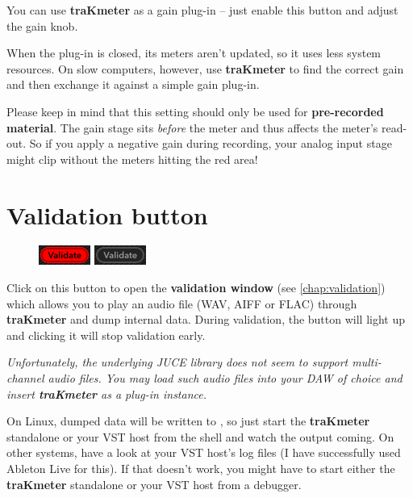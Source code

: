 You can use \textbf{traKmeter} as a gain plug-in -- just enable this
button and adjust the gain knob.

When the plug-in is closed, its meters aren't updated, so it uses less
system resources.  On slow computers, however, use \textbf{traKmeter}
to find the correct gain and then exchange it against a simple gain
plug-in.

Please keep in mind that this setting should only be used for
\textbf{pre-recorded material}.  The gain stage sits \emph{before} the
meter and thus affects the meter's read-out.  So if you apply a
negative gain during recording, your analog input stage might clip
without the meters hitting the red area!

\section{Validation button}
\label{sec:validation_button}

\begin{figure}
  \includegraphics[scale=\screenshotscale,clip]{include/images/button_validate_on.png}
  \newline \vspace{-0.9\baselineskip}
  \includegraphics[scale=\screenshotscale,clip]{include/images/button_validate_off.png}
\end{figure}

Click on this button to open the \textbf{validation window} (see
\ref{chap:validation}) which allows you to play an audio file (WAV,
AIFF or FLAC) through \textbf{traKmeter} and dump internal data.
During validation, the button will light up and clicking it will stop
validation early.

\emph{Unfortunately, the underlying JUCE library does not seem to
  support multi-channel audio files.  You may load such audio files
  into your DAW of choice and insert \textbf{traKmeter} as a plug-in
  instance.}

On Linux, dumped data will be written to , so just start
the \textbf{traKmeter} standalone or your VST host from the shell and
watch the output coming.  On other systems, have a look at your VST
host's log files (I have successfully used Ableton Live for this).  If
that doesn't work, you might have to start either the
\textbf{traKmeter} standalone or your VST host from a debugger.

